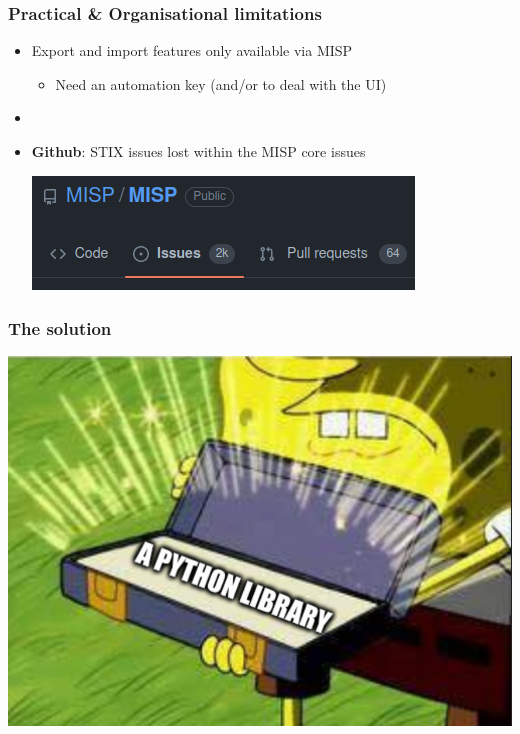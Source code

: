 \begin{frame}
    \frametitle{Practical \& Organisational limitations}
    \begin{itemize}
        \item Export and import features only available via MISP
        \begin{itemize}
            \item Need an automation key (and/or to deal with the UI)
        \end{itemize}
        \item []
        \item {\bf Github}: STIX issues lost within the MISP core issues
        \pause
        \vspace{4em}
        \begin{center}
            \includegraphics[scale=0.4]{images/issues.png}
        \end{center}
    \end{itemize}
\end{frame}

\begin{frame}
    \frametitle{The solution}
    \begin{center}
        \includegraphics[scale=0.3]{images/solution.png}
    \end{center}
\end{frame}

